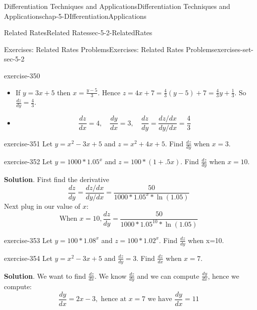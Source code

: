 \documentclass[oneside,10pt,]{book}
\numberwithin{equation}{section}
\begin{document}
\begin{chapterptx}{Differentiation Techniques and Applications}{}{Differentiation Techniques and Applications}{}{}{chap-5-DIfferentiationApplications}
\begin{sectionptx}{Related Rates}{}{Related Rates}{}{}{sec-5-2-RelatedRates}
\begin{exercises-subsection-numberless}{Exercises: Related Rates Problems}{}{Exercises: Related Rates Problems}{}{}{exercises-set-sec-5-2}
\begin{divisionexercise}{5}{}{}{exercise-350}
\leavevmode%
\begin{itemize}[label=\textbullet]
\item{}\hypertarget{p-1981}{}%
If \(y=3x+5\) then \(x=
\frac{y-5}{3}\). Hence \(z=4x+7=\frac{4}{3}  (y-5)+7=\frac{4}{3} y+\frac{1}{3}\). So \(\frac{dz}{dy}=\frac{4}{3}\).%
\item{}%
\begin{equation*}
\frac{dz}{dx}=4, \quad \frac{dy}{dx}=3,\quad
\frac{dz}{dy}=  \frac{dz/dx}{dy/dx}=\frac{4}{3}
\end{equation*}
%
\end{itemize}
\end{divisionexercise}%
\begin{divisionexercise}{6}{}{}{exercise-351}%
\hypertarget{p-1982}{}%
Let \(y=x^2-3x+5\) and \(z=x^2+4x+5\). Find \(\frac{dz}{dy}\) when \(x=3\).%
\end{divisionexercise}%
\begin{divisionexercise}{7}{}{}{exercise-352}%
\hypertarget{p-1983}{}%
Let \(y=1000*1.05^x\) and \(z=100*(1+.5x)\). Find \(\frac{dz}{dy}\) when \(x=10\).%
\par\smallskip%
\noindent\textbf{Solution}.\hypertarget{solution-177}{}\quad%
\hypertarget{p-1984}{}%
First find the derivative%
%
\begin{equation*}
\frac{dz}{dy}=  \frac{dz/dx}{dy/dx}=\frac{50}{1000*1.05^x*\ln(1.05)}
\end{equation*}
\hypertarget{p-1985}{}%
Next plug in our value of \(x\):%
%
\begin{equation*}
\text{When }x=10,   \frac{dz}{dy}=\frac{50}{1000*1.05^{10}*\ln(1.05)}
\end{equation*}
\end{divisionexercise}%
\begin{divisionexercise}{8}{}{}{exercise-353}%
\hypertarget{p-1986}{}%
Let \(y=100*1.08^x\) and \(z=100*1.02^x\). Find \(\frac{dz}{dy}\) when x=10.%
\end{divisionexercise}%
\begin{divisionexercise}{9}{}{}{exercise-354}%
\hypertarget{p-1987}{}%
Let \(y=x^2-3x+5\) and \(\frac{dz}{dy} =3\). Find \(\frac{dz}{dx}\) when \(x=7\).%
\par\smallskip%
\noindent\textbf{Solution}.\hypertarget{solution-178}{}\quad%
\hypertarget{p-1988}{}%
We want to find \(\frac{dz}{dx}\). We know \(\frac{dz}{dy}\) and we can compute \(\frac{dy}{dx}\), hence we compute:%
%
\begin{equation*}
\frac{dy}{dx}=2x-3,\text{ hence at }x=7\text{ we have }\frac{dy}{dx}=11

\end{equation*}
\end{divisionexercise}
\end{exercises-subsection-numberless}
\end{sectionptx}
\end{chapterptx}
\end{document}
